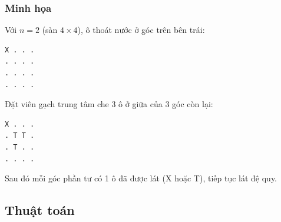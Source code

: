 \documentclass{article}
\begin{document}
\subsubsection{Minh họa}

Với \(n=2\) (sàn \(4\times4\)), ô thoát nước ở góc trên bên trái:

\begin{verbatim}
X . . .
. . . .
. . . .
. . . .
\end{verbatim}

Đặt viên gạch trung tâm che 3 ô ở giữa của 3 góc còn lại:

\begin{verbatim}
X . . .
. T T .
. T . .
. . . .
\end{verbatim}

Sau đó mỗi góc phần tư có 1 ô đã được lát (X hoặc T), tiếp tục lát đệ quy.

\subsection{Thuật toán}
\end{document}
